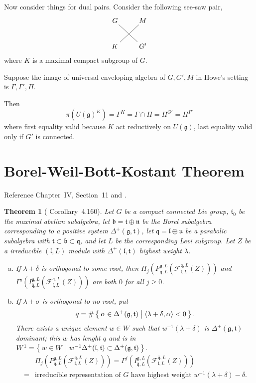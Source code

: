 \documentclass[12pt]{article}
\makeatletter
\newtheorem{thm}{Theorem}
\def\inn#1#2{\left\langle{#1},{#2}\right\rangle}
\def\fbb{\mathfrak{b}}
\def\fnn{\mathfrak{n}}
\def\fuu{\mathfrak{u}}
\def\fll{\mathfrak{l}}
\def\fqq{\mathfrak{q}}
\def\ftt{\mathfrak{t}}
\def\fgg{\mathfrak{g}}
\def\cff{\mathcal{F}}
\def\seesawpair#1#2#3#4{
\xymatrix{
{#1} \ar@{-}[dr]& {#2} \\
{#3} \ar@{-}[ur] & {#4}}
}
\makeatother
\begin{document}
Now consider things for dual pairs.
Consider the following see-saw pair, 
\[
\seesawpair{G}{M}{K}{G'}
\]
where $K$ is a maximal compact subgroup of $G$. 

Suppose the image of universal enveloping algebra of $G,G',M$
in Howe's setting \cite{Howe1989Rem} is $\Gamma,\Gamma', \Pi$.

Then
\[
\pi(U(\fgg)^K) = \Gamma^K = \Gamma \cap \Pi = \Pi^{G'} =\Pi^{\Gamma'}
\]
where first equality valid because $K$ act reductively on $U(\fgg)$,
last equality valid only if $G'$ is connected.



\section{Borel-Weil-Bott-Kostant Theorem}
Reference \cite{KnappVogan1995} Chapter~IV, Section~11 and
\cite{EnrightWallach1980}.

\begin{thm}[\cite{KnappVogan1995} Corollary~4.160]
Let $G$ be a compact connected Lie group, $\ftt_0$ be the maximal abelian 
subalgebra, let $\fbb=\ftt\oplus \fnn$ be the Borel subalgebra corresponding 
to a positive system $\Delta^+(\fgg,\ftt)$, let $\fqq=\fll\oplus \fuu$ 
be a parabolic subalgebra with $\ftt\subset \fbb \subset \fqq$, and let
$L$ be the corresponding Levi subgroup. Let $Z$ be a irreducible $(\fll,L)$
module with $\Delta^+(\fll,\ftt)$ highest weight $\lambda$. 
\begin{enumerate}[(a)]
\item If $\lambda+\delta$ is orthogonal to some root, 
then $\Pi_j(P_{\fqq,L}^{\fgg,L}(\cff_{\fll,L}^{\fqq,L}(Z)))$ and 
$\Gamma^j(I_{\overline{\fqq},L}^{\fgg,L}(\cff_{\fll,L}^{\overline{\fqq},L}(Z)))$
are both $0$ for all $j\geq 0$.
\item If $\lambda+\sigma$ is orthogonal to no root, put
\[
q=\#\Set{\alpha\in \Delta^+(\fgg,\ftt)|\inn{\lambda+\delta}{\alpha}<0}.
\]
There exists a unique element $w\in W$ such that 
$w^{-1}(\lambda+\delta)$ is $\Delta^+(\fgg,\ftt)$ dominant;
this $w$ has lenght $q$ and is in  
$W^1=\Set{w\in W|w^{-1} \Delta^+(\fll,\ftt)\subset \Delta^+(\fgg,\ftt)}$.
\[
\begin{split}
&\Pi_j(P_{\fqq,L}^{\fgg,L}(\cff_{\fll,L}^{\fqq,L}(Z)))=
\Gamma^j(I_{\overline{\fqq},L}^{\fgg,L}(\cff_{\fll,L}^{\overline{\fqq},L}(Z)))\\
=&\text{irreducible representation of $G$ have highest weight }
w^{-1}(\lambda+\delta)-\delta.
\end{split}
\]
\end{enumerate}
\end{thm}
\end{document}
